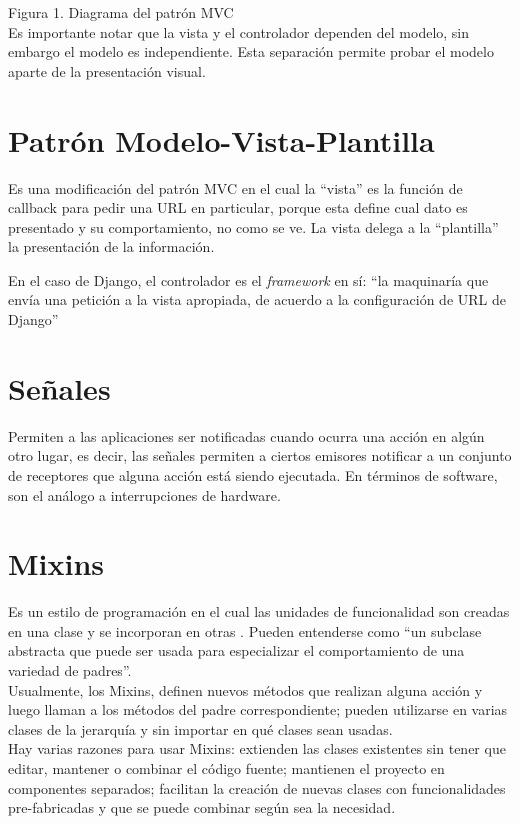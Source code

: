Figura 1. Diagrama del patrón MVC\\

Es importante notar que la vista y el controlador dependen del modelo, sin embargo el modelo es independiente. Esta separación permite probar el modelo aparte de la presentación visual. 

\section{Patrón Modelo-Vista-Plantilla}

Es una modificación del patrón MVC en el cual la “vista” es la función de callback para pedir una URL en particular, porque esta define cual dato es presentado y su comportamiento, no como se ve. La vista delega a la “plantilla”  la presentación de la información.

En el caso de Django, el controlador es el \textit{framework} en sí: “la maquinaría que envía una petición a la vista apropiada, de acuerdo a la configuración de URL de Django” \cite{MVT}

\section{Señales}

Permiten a las aplicaciones ser notificadas cuando ocurra una acción en algún otro lugar, es decir, las señales permiten a ciertos emisores notificar a un conjunto de receptores que alguna acción está siendo ejecutada. \cite{Signals} En términos de software, son el análogo a interrupciones de hardware. \cite{Senales}

\section{Mixins}

Es un estilo de programación en el cual las unidades de funcionalidad son creadas en una clase y se incorporan en otras \cite{Mixins}. Pueden entenderse como “un subclase abstracta que puede ser usada para especializar el comportamiento de una variedad de padres”.  \cite{Mixins2} \\

Usualmente, los Mixins, definen nuevos métodos que realizan alguna acción y luego llaman a los métodos del padre correspondiente; pueden utilizarse en varias clases de la jerarquía y sin importar en qué clases sean usadas. \\

Hay varias razones para usar Mixins: extienden las clases existentes sin tener que editar, mantener o combinar el código fuente; mantienen el proyecto en componentes separados; facilitan la creación de nuevas clases con funcionalidades pre-fabricadas y que se puede combinar según sea la necesidad.\cite{Mixins}


